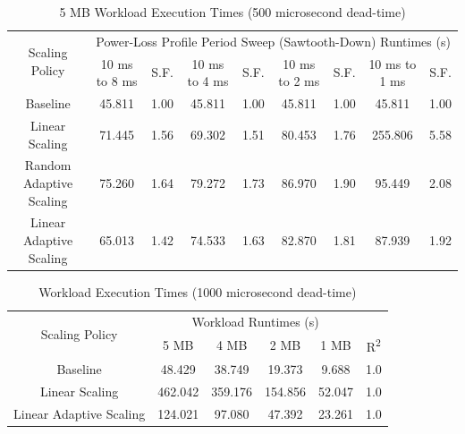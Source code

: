 \documentclass[journal, twoside]{IEEEtran}
\begin{document}
\begin{table}
    \renewcommand{\arraystretch}{1.3} %
    \caption{5 MB Workload Execution Times (500 microsecond dead-time)}
    \label{main-workload-results-500us}
    \centering
    \begin{tabular}{c||c|c|c|c|c|c|c|c}
        \hline
        \multirow{2}{*}{Scaling Policy} & \multicolumn{8}{c}{Power-Loss Profile Period Sweep (Sawtooth-Down) Runtimes (s)} \\\cline{2-9}
        {} & {10 ms to 8 ms} & {S.F.} & {10 ms to 4 ms} & {S.F.} & {10 ms to 2 ms} & {S.F.} & {10 ms to 1 ms} & {S.F.} \\
        \hline
        \hline
        {Baseline}                  & {45.811} & {1.00} & {45.811}  & {1.00} & {45.811} & {1.00}  & {45.811}  & {1.00}\\
        {Linear Scaling}            & {71.445} & {1.56} & {69.302}  & {1.51} & {80.453} & {1.76}  & {255.806} & {5.58}\\
        {Random Adaptive Scaling}   & {75.260} & {1.64} & {79.272}  & {1.73} & {86.970} & {1.90}  & {95.449}  & {2.08}\\
        {Linear Adaptive Scaling}   & {65.013} & {1.42} & {74.533}  & {1.63} & {82.870} & {1.81}  & {87.939}  & {1.92}\\
        \hline
    \end{tabular}
\end{table}

\begin{table}
    \renewcommand{\arraystretch}{1.3} %
    \caption{Workload Execution Times (1000 microsecond dead-time)}
    \label{workload-size-performance}
    \centering
    \begin{tabular}{c||c|c|c|c|c}
        \hline
        \multirow{2}{*}{Scaling Policy} & \multicolumn{4}{c|}{Workload Runtimes (s)}\\\cline{2-6}
        {} & {5 MB} & {4 MB} & {2 MB} & {1 MB} & {R\textsuperscript{2}}\\
        \hline
        \hline
        {Baseline}                  &  {48.429} &  {38.749} &  {19.373} &   {9.688} & {1.0}\\
        {Linear Scaling}            & {462.042} & {359.176} & {154.856} &  {52.047} & {1.0}\\
        {Linear Adaptive Scaling}   & {124.021} &  {97.080} &  {47.392} &  {23.261} & {1.0}\\
        \hline
    \end{tabular}
\end{table}
\end{document}
